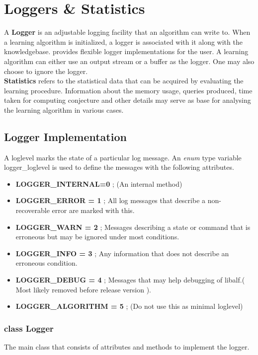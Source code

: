 \chapter{Loggers \& Statistics}

A \textbf{Logger} is an adjustable logging facility that an algorithm can write to. When a learning algorithm is initialized, a logger is associated with it along with the knowledgebase. \libalf provides flexible logger implementations for the user. A learning algorithm can either use an output stream or a buffer as the logger. One may also choose to ignore the logger. \\
\textbf{Statistics} refers to the statistical data that can be acquired by evaluating the learning procedure. Information about the memory usage, queries produced, time taken for computing conjecture and other details may serve as base for analysing the learning algorithm in various cases. 

\section{Logger Implementation}
A loglevel marks the state of a particular log message. An \emph{enum} type variable logger\_loglevel is used to define the messages with the following attributes.
\begin{itemize}
 \item \textbf{LOGGER\_INTERNAL=0} ; (An internal method)
 \item \textbf{LOGGER\_ERROR = 1} ; All log messages that describe a non-recoverable error are marked with this.
 \item \textbf{LOGGER\_WARN = 2} ; Messages describing a state or command that is erroneous but may be ignored under most conditions.
 \item \textbf{LOGGER\_INFO = 3} ; Any information that does not describe an erroneous condition.
 \item \textbf{LOGGER\_DEBUG = 4} ; Messages that may help debugging of libalf.( Most likely removed before release version ).
 \item \textbf{LOGGER\_ALGORITHM = 5} ; (Do not use this as minimal loglevel)
\end{itemize}

\subsection{class Logger}
The main class that consists of attributes and methods to implement the logger. 


